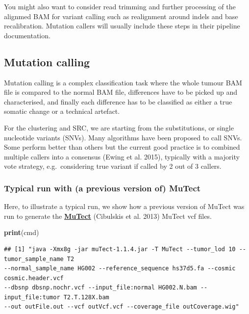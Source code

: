 \documentclass[]{article}
\newenvironment{Shaded}{\begin{snugshade}}{\end{snugshade}}
\newcommand{\KeywordTok}[1]{\textcolor[rgb]{0.13,0.29,0.53}{\textbf{#1}}}
\newcommand{\NormalTok}[1]{#1}
\begin{document}
You might also want to consider read trimming and further processing of
the alignmed BAM for variant calling such as realignment around indels
and base recalibration. Mutation callers will usually include these
steps in their pipeline documentation.

\hypertarget{mutation-calling}{%
\subsection{Mutation calling}\label{mutation-calling}}

Mutation calling is a complex classification task where the whole tumour
BAM file is compared to the normal BAM file, differences have to be
picked up and characterised, and finally each difference has to be
classified as either a true somatic change or a technical artefact.

For the clustering and SRC, we are starting from the substitutions, or
single nucleotide variants (SNVs). Many algorithms have been proposed to
call SNVs. Some perform better than others but the current good practice
is to combined multiple callers into a consensus (Ewing et al. 2015),
typically with a majority vote strategy, e.g.~considering true variant
if called by 2 out of 3 callers.

\hypertarget{typical-run-with-a-previous-version-of-mutect}{%
\subsubsection{Typical run with (a previous version of)
MuTect}\label{typical-run-with-a-previous-version-of-mutect}}

Here, to illustrate a typical run, we show how a previous version of
MuTect was run to generate the
\href{https://software.broadinstitute.org/cancer/cga/mutect_download}{\textbf{MuTect}}
(Cibulskis et al. 2013) MuTect vcf files.

\begin{Shaded}
\begin{Highlighting}[]
\KeywordTok{print}\NormalTok{(cmd)}
\end{Highlighting}
\end{Shaded}

\begin{verbatim}
## [1] "java -Xmx8g -jar muTect-1.1.4.jar -T MuTect --tumor_lod 10 --tumor_sample_name T2
--normal_sample_name HG002 --reference_sequence hs37d5.fa --cosmic cosmic.header.vcf
--dbsnp dbsnp.nochr.vcf --input_file:normal HG002.N.bam --input_file:tumor T2.T.128X.bam
--out outFile.out --vcf outVcf.vcf --coverage_file outCoverage.wig"
\end{verbatim}
\end{document}
